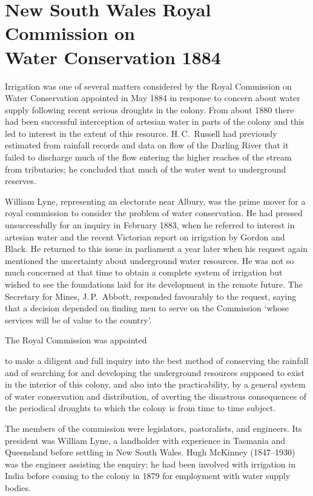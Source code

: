 \section*{New South Wales Royal Commission on \\
Water Conservation 1884}

Irrigation was one of several matters considered by the Royal
Commission on Water Conservation appointed in May 1884 in response to
concern about water supply following recent serious
droughts in the colony.  From about 1880 there had been
successful interception of artesian water in parts of the colony and
this led to interest in the extent of this resource.  H.\,C.~Russell
 had previously estimated from rainfall records
and data on flow of the Darling River  that it
failed to discharge much of the flow entering the higher reaches of
the stream from tributaries; he concluded that much of the water went
to underground reserves.

William Lyne,  representing an electorate near Albury,
was the prime mover for a royal commission to consider the problem of
water conservation.  He had pressed unsuccessfully for an inquiry in
February 1883, when he referred to interest in artesian water and the
recent Victorian report on irrigation by Gordon and Black.  He
returned to this issue in parliament a year later when his request
again mentioned the uncertainty about underground water resources.  He
was not so much concerned at that time to obtain a complete system of
irrigation but wished to see the foundations laid for its development
in the remote future.  The Secretary for Mines, J.\,P.~Abbott,
 responded favourably to the request, saying
that a decision depended on finding men to serve on the Commission
`whose services will be of value to the country'.

The Royal Commission was appointed
\begin{Quote}
	to make a diligent and full inquiry into the best method of
	conserving the rainfall and of searching for and developing
	the underground resources supposed to exist in the interior of
	this colo\-ny, and also into the practicability, by a general
	system of water conservation and distribution, of averting the
	disastrous consequ\-en\-ces of the periodical
	droughts to which the colony is from time to
	time subject.
\end{Quote}
The members of the commission were legislators, pastoralists, and
engineers. Its president was William Lyne, a landholder with
experience in Tasmania and Queensland before settling in New South
Wales. Hugh McKinney  (1847--1930) was the
engineer assisting the enquiry; he had been involved with irrigation
in India before coming to the colony in 1879 for employment with water
supply bodies.

